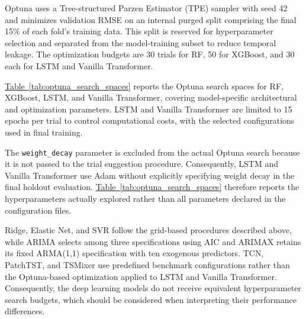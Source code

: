 \documentclass[runningheads,orivec]{llncs}
\begin{document}
Optuna uses a Tree-structured Parzen Estimator (TPE) sampler with seed 42~\cite{akiba2019} and minimizes validation RMSE on an internal purged split comprising the final 15\% of each fold's training data. This split is reserved for hyperparameter selection and separated from the model-training subset to reduce temporal leakage. The optimization budgets are 30 trials for RF, 50 for XGBoost, and 30 each for LSTM and Vanilla Transformer.

\hyperref[tab:optuna_search_spaces]{Table~\ref*{tab:optuna_search_spaces}} reports the Optuna search spaces for RF, XGBoost, LSTM, and Vanilla Transformer, covering model-specific architectural and optimization parameters. LSTM and Vanilla Transformer are limited to 15 epochs per trial to control computational costs, with the selected configurations used in final training.

The \texttt{weight\_decay} parameter is excluded from the actual Optuna search because it is not passed to the trial suggestion procedure. Consequently, LSTM and Vanilla Transformer use Adam without explicitly specifying weight decay in the final holdout evaluation. \hyperref[tab:optuna_search_spaces]{Table~\ref*{tab:optuna_search_spaces}} therefore reports the hyperparameters actually explored rather than all parameters declared in the configuration files.

Ridge, Elastic Net, and SVR follow the grid-based procedures described above, while ARIMA selects among three specifications using AIC and ARIMAX retains its fixed ARMA(1,1) specification with ten exogenous predictors. TCN, PatchTST, and TSMixer use predefined benchmark configurations rather than the Optuna-based optimization applied to LSTM and Vanilla Transformer. Consequently, the deep learning models do not receive equivalent hyperparameter search budgets, which should be considered when interpreting their performance differences.
\end{document}
